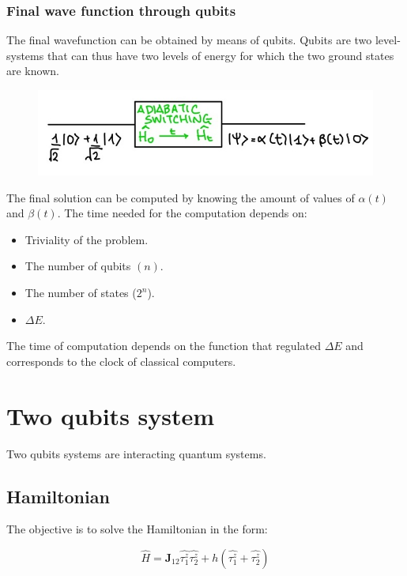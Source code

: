 	\subsubsection{Final wave function through qubits}
	The final wavefunction can be obtained by means of qubits.
	Qubits are two level-systems that can thus have two levels of energy for which the two ground states are known.

\begin{figure}[htbp!]
	\centering
	\includegraphics[scale=0.30]{img_10}
\end{figure}

The final solution can be computed by knowing the amount of values of $\alpha(t)$ and $\beta(t)$.
The time needed for the computation depends on:

\begin{multicols}{2}
	\begin{itemize}
		\item Triviality of the problem.
		\item The number of qubits $(n)$.
		\item The number of states ($2^n$).
		\item $\Delta E$.
	\end{itemize}
\end{multicols}

The time of computation depends on the function that regulated $\Delta E$ and corresponds to the clock of classical computers.

\section{Two qubits system}
Two qubits systems are interacting quantum systems.

	\subsection{Hamiltonian}
	The objective is to solve the Hamiltonian in the form:

	$$\hat{H}=\mathbf{J}_{12}\hat{\tau_1^z}\hat{\tau_2^z}+h(\hat{\tau_1^z}+\hat{\tau_2^z})$$


